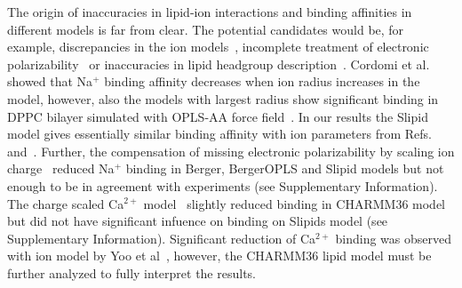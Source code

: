 \documentclass[pre,aps,floatfix,authordate1-4,twocolumn]{revtex4-1}
\begin{document}

The origin of inaccuracies in lipid-ion interactions and binding affinities in different models is far from clear.
The potential candidates would be, for example, discrepancies in the ion models~\cite{hess06,chen07,Reif13},
incomplete treatment of electronic polarizability~\cite{leontyev11} or inaccuracies in lipid headgroup 
description~\cite{botan15}. Cordomi et al.~\cite{cordomi09} showed that Na$^+$ binding affinity decreases when ion radius increases
in the model, however, also the models with largest radius show significant binding in DPPC bilayer simulated with
OPLS-AA force field~\cite{jorgensen96}. In our results the Slipid model gives essentially similar binding affinity with 
ion parameters from Refs.~\cite{smith94} and~\cite{beglov94,roux96}. Further, the compensation of missing electronic 
polarizability by scaling ion charge~\cite{kohagen16,leontyev11} reduced Na$^+$ binding in Berger, 
BergerOPLS and Slipid models but not enough to be in agreement with experiments (see Supplementary Information). 
The charge scaled Ca$^{2+}$ model~\cite{kohagen14} slightly reduced binding in CHARMM36 model but did not have 
significant infuence on binding on Slipids model (see Supplementary Information). Significant reduction of
Ca$^{2+}$ binding was observed with ion model by Yoo et al~\cite{yoo16}, however, the CHARMM36 lipid
model must be further analyzed to fully interpret the results.
\end{document}
